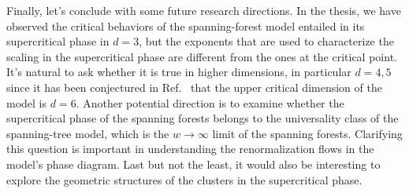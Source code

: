 Finally, let's conclude with some future research directions. In the thesis, we have observed the critical behaviors of the spanning-forest model entailed in its supercritical phase in $d=3$, but
the exponents that are used to characterize the scaling in the supercritical phase are different from the ones at the critical point. 
It's natural to ask whether it is true in higher dimensions, in particular $d=4, 5$ since it has been conjectured in Ref.~ that the upper 
critical dimension of the model is $d=6$. Another potential direction is to examine whether the supercritical phase of the spanning forests
belongs to the universality class of the spanning-tree model, which is the $w\to \infty$ limit of the spanning forests. 
Clarifying this question is important in understanding the renormalization flows in the model's phase diagram. Last but not the least,
it would also be interesting to explore the geometric structures of the clusters in the supercritical phase.

